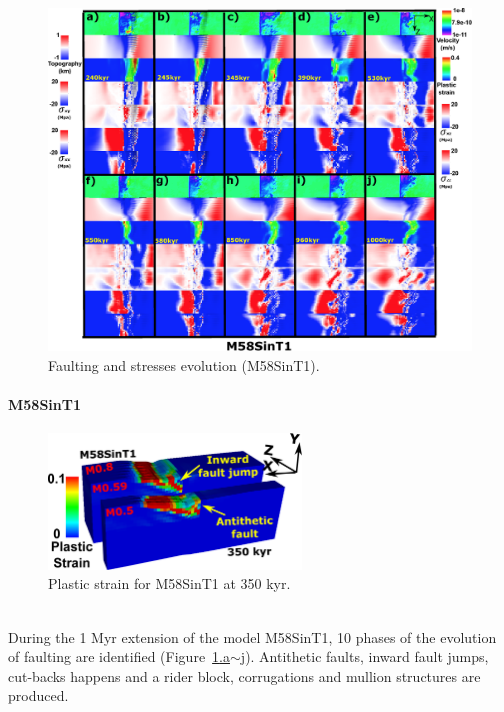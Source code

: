 \begin{figure}[h]
 \centering
  \includegraphics[width=1.0\textwidth]{./Figures/fig_Results_Weakening_5_M58SinT1_time_evolution.eps}
 \caption{Faulting and stresses evolution (M58SinT1).}
\label{fig_Results_Weakenging_5}
\end{figure}

\paragraph{M58SinT1}\label{para_M58SinT1}

\begin{figure}[h]
 \centering
  \includegraphics[width=0.6\textwidth]{./Figures/fig_Results_3_4_2_3D_Antithetic_fault.eps}
 \caption{Plastic strain for M58SinT1 at 350 kyr.}
\label{fig_Results_3_4_2_3D_Antithetic_fault}
\end{figure}

~\\
During the 1 Myr extension of the model M58SinT1, 10 phases of the evolution of faulting are identified (Figure~\hyperref[fig_Results_Weakenging_5]{\ref{fig_Results_Weakenging_5}.a$\sim$j}). Antithetic faults, inward fault jumps, cut-backs happens and a rider block, corrugations and mullion structures are produced.

